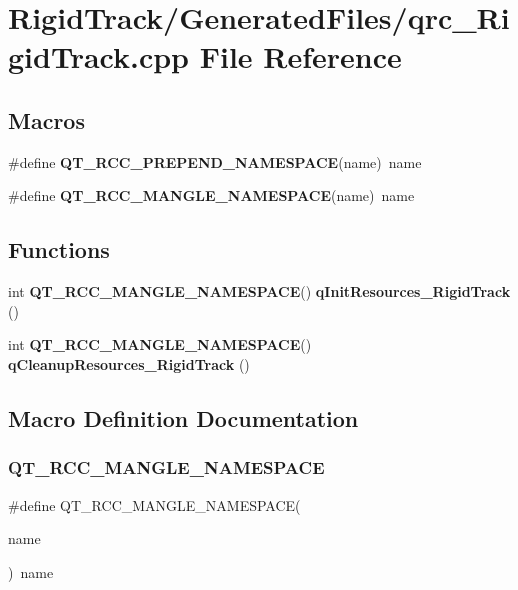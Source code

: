 \section{Rigid\+Track/\+Generated\+Files/qrc\+\_\+\+Rigid\+Track.cpp File Reference}
\label{qrc___rigid_track_8cpp}
\subsection*{Macros}
\begin{DoxyCompactItemize}
\item 
\#define \textbf{ Q\+T\+\_\+\+R\+C\+C\+\_\+\+P\+R\+E\+P\+E\+N\+D\+\_\+\+N\+A\+M\+E\+S\+P\+A\+CE}(name)~name
\item 
\#define \textbf{ Q\+T\+\_\+\+R\+C\+C\+\_\+\+M\+A\+N\+G\+L\+E\+\_\+\+N\+A\+M\+E\+S\+P\+A\+CE}(name)~name
\end{DoxyCompactItemize}
\subsection*{Functions}
\begin{DoxyCompactItemize}
\item 
int \textbf{ Q\+T\+\_\+\+R\+C\+C\+\_\+\+M\+A\+N\+G\+L\+E\+\_\+\+N\+A\+M\+E\+S\+P\+A\+CE}() \textbf{ q\+Init\+Resources\+\_\+\+Rigid\+Track} ()
\item 
int \textbf{ Q\+T\+\_\+\+R\+C\+C\+\_\+\+M\+A\+N\+G\+L\+E\+\_\+\+N\+A\+M\+E\+S\+P\+A\+CE}() \textbf{ q\+Cleanup\+Resources\+\_\+\+Rigid\+Track} ()
\end{DoxyCompactItemize}


\subsection{Macro Definition Documentation}
\mbox{\label{qrc___rigid_track_8cpp_a590f80ddb226779f6f432d80438ea190}} 
\subsubsection{Q\+T\+\_\+\+R\+C\+C\+\_\+\+M\+A\+N\+G\+L\+E\+\_\+\+N\+A\+M\+E\+S\+P\+A\+CE}
{\footnotesize\ttfamily \#define Q\+T\+\_\+\+R\+C\+C\+\_\+\+M\+A\+N\+G\+L\+E\+\_\+\+N\+A\+M\+E\+S\+P\+A\+CE(\begin{DoxyParamCaption}\item[{}]{name }\end{DoxyParamCaption})~name}


